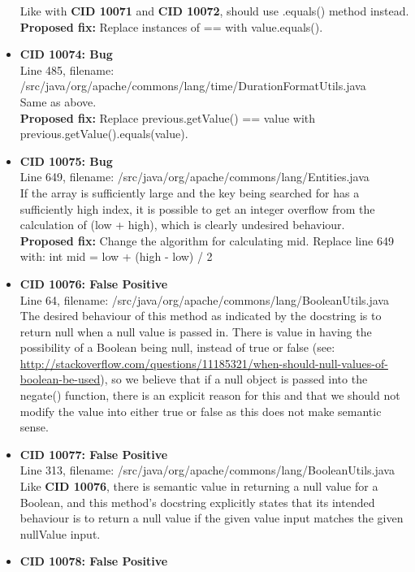 \documentclass{article}
\begin{document}
\begin{itemize}
    Like with \textbf{CID 10071} and \textbf{CID 10072}, should use .equals() method instead. \\
    \textbf{Proposed fix:} Replace instances of == with value.equals().
\item \textbf{CID 10074: Bug} \\
    Line 485, filename: /src/java/org/apache/commons/lang/time/DurationFormatUtils.java \\
    Same as above. \\
    \textbf{Proposed fix:} Replace previous.getValue() == value with previous.getValue().equals(value).
\item \textbf{CID 10075: Bug} \\
    Line 649, filename: /src/java/org/apache/commons/lang/Entities.java \\
    If the array is sufficiently large and the key being searched for has a sufficiently high index, it is possible to get an integer
    overflow from the calculation of (low + high), which is clearly undesired behaviour. \\
    \textbf{Proposed fix:} Change the algorithm for calculating mid. Replace line 649 with: int mid = low + (high - low) / 2
\item \textbf{CID 10076: False Positive} \\
    Line 64, filename: /src/java/org/apache/commons/lang/BooleanUtils.java \\
    The desired behaviour of this method as indicated by the docstring is to return null when a null value is passed in.
    There is value in having the possibility of a Boolean being null, instead of true or false 
    (see: \url{http://stackoverflow.com/questions/11185321/when-should-null-values-of-boolean-be-used}), so we believe that
    if a null object is passed into the negate() function, there is an explicit reason for this and that we should not
    modify the value into either true or false as this does not make semantic sense.
\item \textbf{CID 10077: False Positive} \\
    Line 313, filename: /src/java/org/apache/commons/lang/BooleanUtils.java \\
    Like \textbf{CID 10076}, there is semantic value in returning a null value for a Boolean, and this method's docstring
    explicitly states that its intended behaviour is to return a null value if the given value input matches the given nullValue input.
\item \textbf{CID 10078: False Positive} \\

\end{itemize}
\end{document}
